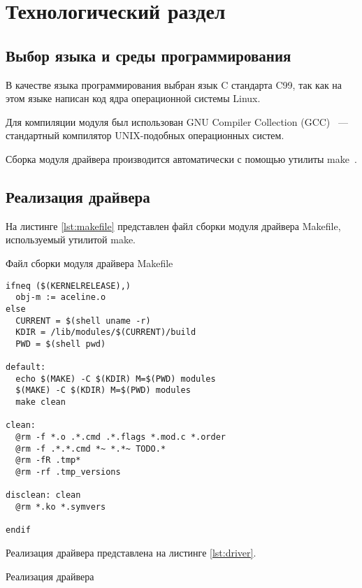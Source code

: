 \section{Технологический раздел}

\subsection{Выбор языка и среды программирования}

В качестве языка программирования выбран язык C \cite{gnu} стандарта C99, так как на этом языке написан код ядра операционной системы Linux.

Для компиляции модуля был использован GNU Compiler Collection (GCC)~\cite{gcc} --- стандартный компилятор UNIX-подобных операционных систем.

Сборка модуля драйвера производится автоматически с помощью утилиты make~\cite{make}.

\subsection{Реализация драйвера}

На листинге \ref{lst:makefile} представлен файл сборки модуля драйвера Makefile, используемый утилитой make.

\begin{longlisting}
	\singlespacing
	\caption{Файл сборки модуля драйвера Makefile}
	\label{lst:makefile}
	\begin{verbatim}
ifneq ($(KERNELRELEASE),)
  obj-m := aceline.o
else
  CURRENT = $(shell uname -r)
  KDIR = /lib/modules/$(CURRENT)/build 
  PWD = $(shell pwd)

default:
  echo $(MAKE) -C $(KDIR) M=$(PWD) modules
  $(MAKE) -C $(KDIR) M=$(PWD) modules
  make clean

clean:
  @rm -f *.o .*.cmd .*.flags *.mod.c *.order
  @rm -f .*.*.cmd *~ *.*~ TODO.*
  @rm -fR .tmp*
  @rm -rf .tmp_versions

disclean: clean
  @rm *.ko *.symvers
  
endif
	\end{verbatim}
\end{longlisting}

Реализация драйвера представлена на листинге \ref{lst:driver}.

\begin{longlisting}
	\singlespacing
	\caption{Реализация драйвера}
	\inputminted[frame=single,fontsize = \footnotesize, linenos, breaklines, xleftmargin = 1.5em,breaksymbol = ""]{c}{../lst/driver.c}
	\label{lst:driver}
\end{longlisting}


